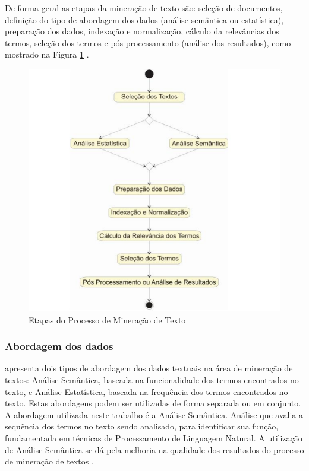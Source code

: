 De forma geral as etapas da mineração de texto são: seleção de documentos, definição do tipo de abordagem dos dados (análise semântica ou estatística), preparação dos dados, indexação e normalização, cálculo da relevâncias dos termos, seleção dos termos e pós-processamento (análise dos resultados), como mostrado na Figura \ref{fig:figura-2} \cite{morais2007mineraccao}.

\begin{figure}[H] %
	\caption{\label{fig:figura-2} Etapas do Processo de Mineração de Texto}
	\begin{center}
	    \includegraphics[scale=0.8]{figuras/figura_2.PNG} %
	\end{center}
\end{figure}

\subsubsection{Abordagem dos dados}
 apresenta dois tipos de abordagem dos dados textuais na área de mineração de textos: Análise Semântica, baseada na funcionalidade dos termos encontrados no texto, e Análise Estatística, baseada na frequência dos termos encontrados no texto. Estas abordagens podem ser utilizadas de forma separada ou em conjunto. A abordagem utilizada neste trabalho é a Análise Semântica.
Análise que avalia a sequência dos termos no texto sendo analisado, para identificar sua função, fundamentada em técnicas de Processamento de Linguagem Natural. A utilização de Análise Semântica se dá pela melhoria na qualidade dos resultados do processo de mineração de textos \cite{morais2007mineraccao}.

